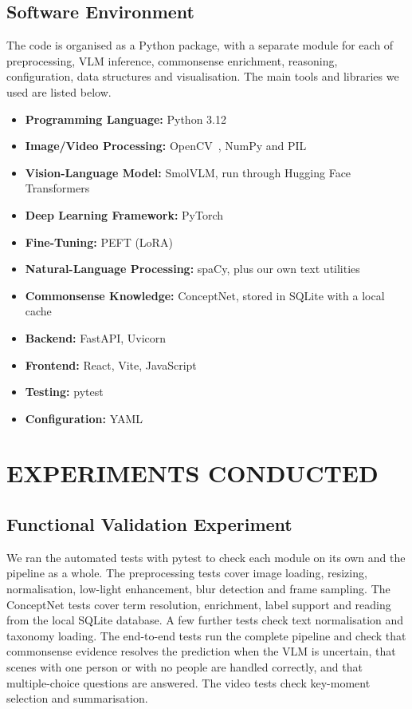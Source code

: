 \subsection{Software Environment}
The code is organised as a Python package, with a separate module for each of preprocessing, VLM inference, commonsense enrichment, reasoning, configuration, data structures and visualisation. The main tools and libraries we used are listed below.
\begin{itemize}
    \item \textbf{Programming Language:} Python 3.12
    \item \textbf{Image/Video Processing:} OpenCV~\cite{bradski2000opencv}, NumPy and PIL
    \item \textbf{Vision-Language Model:} SmolVLM, run through Hugging Face Transformers~\cite{wolf2020transformers}
    \item \textbf{Deep Learning Framework:} PyTorch~\cite{paszke2019pytorch}
    \item \textbf{Fine-Tuning:} PEFT (LoRA)
    \item \textbf{Natural-Language Processing:} spaCy, plus our own text utilities
    \item \textbf{Commonsense Knowledge:} ConceptNet, stored in SQLite with a local cache
    \item \textbf{Backend:} FastAPI, Uvicorn
    \item \textbf{Frontend:} React, Vite, JavaScript
    \item \textbf{Testing:} pytest
    \item \textbf{Configuration:} YAML
\end{itemize}

\section{EXPERIMENTS CONDUCTED}

\subsection{Functional Validation Experiment}
We ran the automated tests with pytest to check each module on its own and the pipeline as a whole. The preprocessing tests cover image loading, resizing, normalisation, low-light enhancement, blur detection and frame sampling. The ConceptNet tests cover term resolution, enrichment, label support and reading from the local SQLite database. A few further tests check text normalisation and taxonomy loading. The end-to-end tests run the complete pipeline and check that commonsense evidence resolves the prediction when the VLM is uncertain, that scenes with one person or with no people are handled correctly, and that multiple-choice questions are answered. The video tests check key-moment selection and summarisation.

